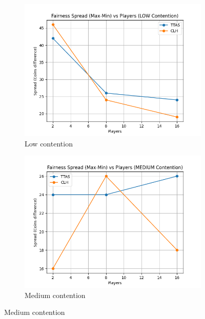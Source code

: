 \documentclass[12pt,a4paper]{article}
\begin{document}
\begin{figure}[H]
  \centering
  \begin{subfigure}{0.48\textwidth}
    \centering
    \includegraphics[width=\linewidth]{plot_fairness_LOW.png}
    \caption{Low contention}
    \label{fig:fairness-low}
  \end{subfigure}
  \hfill
  \begin{subfigure}{0.48\textwidth}
    \centering
    \includegraphics[width=\linewidth]{plot_fairness_MEDIUM.png}
    \caption{Medium contention}
    \label{fig:fairness-med}
  \end{subfigure}
  

\end{figure}
\end{document}
